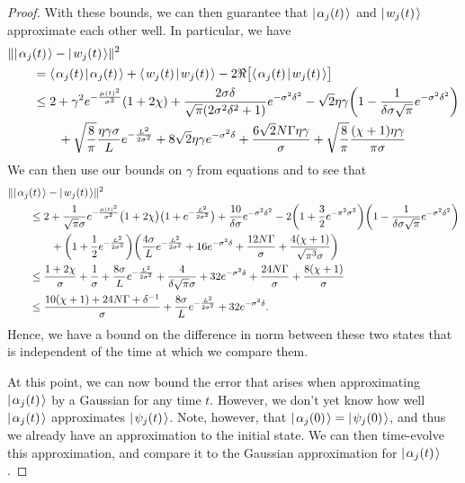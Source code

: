 \documentclass[../thesis-main/thesis-main]{subfiles}
\begin{document}
\begin{proof}
With these bounds, we can then guarantee that $|\mspace{2mu} \alpha_j(t) \mspace{2mu} \rangle$ and $|\mspace{2mu} w_j(t) \mspace{2mu} \rangle$ approximate each other well.  In particular, we have
\begin{align}
  &\|{|\mspace{2mu} \alpha_j(t) \mspace{2mu} \rangle - |\mspace{2mu} w_j(t) \mspace{2mu} \rangle}\|^2\nonumber\\
  &\qquad= \langle\mspace{2mu} \alpha_j(t) \mspace{2mu} | \mspace{2mu} \alpha_j(t)\mspace{2mu} \rangle + \langle\mspace{2mu} w_j(t) \mspace{2mu} | \mspace{2mu} w_j(t)\mspace{2mu} \rangle - 2 \Re\big[ \langle\mspace{2mu} \alpha_j(t) \mspace{2mu} | \mspace{2mu} w_j(t)\mspace{2mu} \rangle \big]\\
  & \qquad \leq 2 + \gamma^2 e^{-\frac{\mu(t)^2}{\sigma^2}}(1 + 2 \chi) + \frac{2\sigma\delta}{\sqrt{\pi}(2\sigma^2\delta^2 +1)} e^{-\sigma^2\delta^2}  - \sqrt{2}\eta\gamma \bigg(1 - \frac{1}{\delta\sigma\sqrt{\pi}} e^{-\sigma^2\delta^2} \bigg) \nonumber\\
  & \qquad\qquad+ \sqrt{\frac{8}{\pi}}\frac{\eta\gamma \sigma}{L} e^{-\frac{L^2}{2\sigma^2}}+ 8\sqrt{2}\eta\gamma e^{-\sigma^2\delta} + \frac{6 \sqrt{2} N\Gamma\eta\gamma}{\sigma} + \sqrt{\frac{8}{\pi}} \frac{(\chi + 1)\eta\gamma}{\pi \sigma}
\end{align}
We can then use our bounds on $\gamma$ from equations  and  to see that
\begin{align}
  &\|{|\mspace{2mu} \alpha_j(t) \mspace{2mu} \rangle - |\mspace{2mu} w_j(t) \mspace{2mu} \rangle}\|^2 \nonumber\\
  &\qquad\leq  2 + \frac{1}{\sqrt{\pi}\sigma} e^{-\frac{\mu(t)^2}{\sigma^2}} \big(1 + 2 \chi\big)\big( 1 + e^{-\frac{L^2}{2\sigma^2}}\big) + \frac{10}{\delta \sigma} e^{-\sigma^2\delta^2} - 2\bigg(1 + \frac{3}{2} e^{-\pi^2\sigma^2}\bigg) \bigg(1 - \frac{1}{\delta\sigma\sqrt{\pi}} e^{-\sigma^2\delta^2} \bigg)\nonumber\\
  &\qquad \qquad +\bigg( 1 + \frac{1}{2}e^{-\frac{L^2}{2\sigma^2}}\bigg)\bigg(\frac{4\sigma}{L}e^{-\frac{L^2}{2\sigma^2}} + 16 e^{-\sigma^2\delta} + \frac{12 N \Gamma}{\sigma} + \frac{4 (\chi+1)}{\sqrt{\pi^3} \sigma} \bigg)\\
  &\qquad \leq \frac{1+2\chi}{\sigma} + \frac{1}{\sigma} +\frac{8\sigma}{L}e^{-\frac{L^2}{2\sigma^2}} + \frac{4}{\delta\sqrt{\pi}\sigma}+ 32 e^{-\sigma^2\delta} + \frac{24 N \Gamma}{\sigma} + \frac{8(\chi + 1)}{\sigma}\\
  &\qquad \leq \frac{10(\chi+1) + 24 N\Gamma + \delta^{-1}}{\sigma} + \frac{8\sigma}{L} e^{-\frac{L^2}{2\sigma^2}} + 32 e^{-\sigma^2\delta}.
\end{align}
Hence, we have a bound on the difference in norm between these two states that is independent of the time at which we compare them.


At this point, we can now bound the error that arises when approximating $|\mspace{2mu} \alpha_j(t) \mspace{2mu} \rangle$ by a Gaussian for any time $t$.  However, we don't yet know how well $|\mspace{2mu} \alpha_j(t) \mspace{2mu} \rangle$ approximates $|\mspace{2mu} \psi_j(t) \mspace{2mu} \rangle$.  Note, however, that $|\mspace{2mu} \alpha_j(0) \mspace{2mu} \rangle = |\mspace{2mu} \psi_j(0) \mspace{2mu} \rangle$, and thus we already have an approximation to the initial state.  We can then time-evolve this approximation, and compare it to the Gaussian approximation for $|\mspace{2mu} \alpha_j(t) \mspace{2mu} \rangle$. 


\end{proof}
\end{document}
